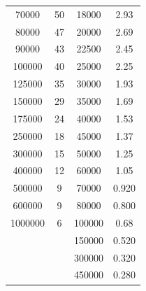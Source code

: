 \begin{table}
\begin{tabular}{c c | c c}
    70000   &  50  &  18000  &  2.93 \\
    80000   &  47  &  20000  &  2.69 \\
    90000   &  43  &  22500  &  2.45 \\
    100000  &  40  &  25000  &  2.25 \\
    125000  &  35  &  30000  &  1.93 \\
    150000  &  29  &  35000  &  1.69 \\
    175000  &  24  &  40000  &  1.53 \\
    250000  &  18  &  45000  &  1.37 \\
    300000  &  15  &  50000  &  1.25 \\
    400000  &  12  &  60000  &  1.05 \\
    500000  &  9   &  70000  &  0.920 \\
    600000  &  9   &  80000  &  0.800 \\
    1000000 &  6   &  100000 &  0.68  \\
            &      &  150000 &  0.520 \\
            &      &  300000 &  0.320 \\
            &      &  450000 &  0.280 \\
    \bottomrule
  \end{tabular}
\end{table}


